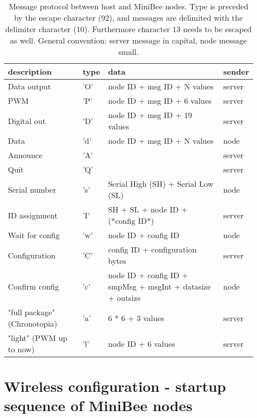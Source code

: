 \documentclass[letterpaper,10pt]{article}
\begin{document}
\begin{table}
 
\begin{center}
\begin{tabular}{llll}
description & type & data & sender\\
\hline
Data output & 'O' & node ID + msg ID + N values & server\\
PWM & 'P' & node ID + msg ID + 6 values & server\\
Digital out & 'D' & node ID + msg ID + 19 values & server\\
Data & 'd' & node ID + msg ID + N values & node\\
\hline
Announce & 'A' &  & server \\
Quit & 'Q' &  & server \\
Serial number & 's' & Serial High (SH) + Serial Low (SL) & node\\
ID assignment & 'I' & SH + SL + node ID + (*config ID*) & server \\
Wait for config & 'w' & node ID + config ID & node \\
Configuration & 'C' & config ID + configuration bytes & server \\
Confirm config & 'c' & node ID + config ID + smpMsg + msgInt + datasize + outsize & node \\
\hline
"full package" (Chronotopia) & 'a' & 6 * 6 + 3 values & server \\
"light" (PWM up to now)      & 'l' & node ID + 6 values & server
\end{tabular}
\end{center}
\caption{Message protocol between host and MiniBee nodes. Type is preceded by the escape character (92), and messages are delimited with the delimiter character (10). Furthermore character 13 needs to be escaped as well. General convention: server message in capital, node message small.}
\end{table}


\section{Wireless configuration - startup sequence of MiniBee nodes}
\end{document}
